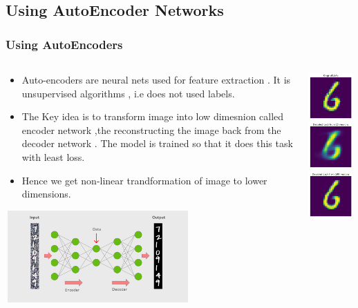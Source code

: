 \documentclass[12pt,t]{beamer}
\begin{document}
\subsection{Using AutoEncoder Networks}
\begin{frame}
    \frametitle{Using AutoEncoders}
    \scriptsize
    \begin{columns}
        \begin{column}[T]{0.8\linewidth}
            \begin{itemize}
                \item Auto-encoders are neural nets used for feature extraction . It is unsupervised 
                    algorithms , i.e does not used labels.
                \item  The Key idea is to transform image into low dimesnion called encoder network ,the
                        reconstructing the image back from the decoder network . The model is trained so 
                        that it does this task with least loss.
                \item  Hence we get non-linear trandformation of image to lower dimensions.
            \end{itemize}
            \includegraphics[width=200pt,height=100pt]{auto_encoders/diag.png}
            
        \end{column}

        \begin{column}[T]{0.2\linewidth}
            \includegraphics[width=\linewidth,height=50pt]{auto_encoders/original_6_digit.png}    
            \includegraphics[width=\linewidth,height=50pt]{auto_encoders/decoded_from_15__6_digit.png}
            \includegraphics[width=\linewidth,height=50pt]{auto_encoders/decoded_from_100__6_digit.png}    
        \end{column}

    \end{columns}

    

\end{frame}
\end{document}
